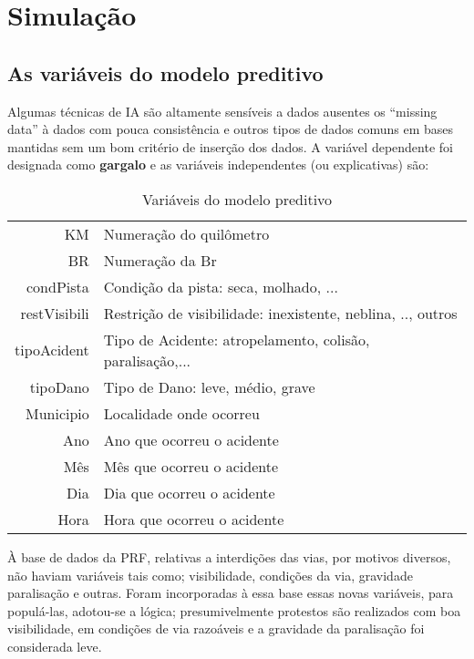 \chapter{Simulação}\label{simula}

\section{ As variáveis do modelo preditivo}

Algumas técnicas de IA são altamente sensíveis a dados ausentes os ``missing data'' à dados com pouca consistência e outros tipos de dados 
comuns em bases mantidas sem um bom critério de inserção dos dados. 
A variável dependente foi designada como \textbf{gargalo} e as variáveis independentes (ou explicativas) são:


\begin{table}[htbp]
 \centering
  \caption{Variáveis do modelo preditivo}
  
  \begin{tabular}{r|l} \hline
   KM & Numeração do quilômetro \\
   BR & Numeração da Br\\
   condPista & Condição da pista: seca, molhado, ... \\
   restVisibili & Restrição de visibilidade: inexistente, neblina, .., outros \\
   tipoAcident & Tipo de Acidente: atropelamento, colisão, paralisação,...\\
   tipoDano  & Tipo de Dano: leve, médio, grave \\
   Municipio  & Localidade onde ocorreu \\
   Ano & Ano que ocorreu o acidente \\
   Mês & Mês que ocorreu o acidente \\
   Dia & Dia que ocorreu o acidente \\
   Hora & Hora que ocorreu o acidente \\
  \end{tabular}
\end{table}

 
À base de dados da PRF, relativas a interdições das vias, por motivos diversos, não haviam variáveis tais como; visibilidade, condições da via, gravidade paralisação e outras.
Foram incorporadas à essa base essas novas variáveis, para populá-las, adotou-se a lógica; presumivelmente protestos são realizados com boa visibilidade, em condições de via razoáveis e a gravidade da paralisação foi considerada leve.

